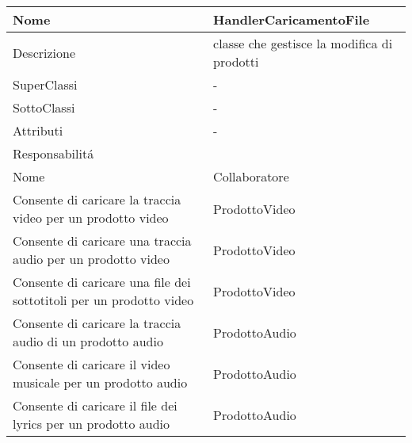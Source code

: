 \begin{center} 
    \begin{longtable}{ |p{3cm}|p{3cm}|p{3cm}|p{3cm}| }
        \hline
        Nome & \multicolumn{3}{|p{9cm}|}{HandlerCaricamentoFile} \\\hline
        Descrizione & \multicolumn{3}{|p{9cm}|}{classe che gestisce la modifica di prodotti} \\\hline
        SuperClassi & \multicolumn{3}{|p{9cm}|}{-} \\\hline
        SottoClassi & \multicolumn{3}{|p{9cm}|}{-} \\\hline
        Attributi & \multicolumn{3}{|p{9cm}|}{-} \\\hline
        \multicolumn{4}{|p{12cm}|}{Responsabilit\'a} \\\hline %
        \multicolumn{2}{|p{6cm}|}{Nome} & \multicolumn{2}{|p{6cm}|}{Collaboratore} \\\hline
        \multicolumn{2}{|p{6cm}|}{Consente di caricare la traccia video per un prodotto video} & \multicolumn{2}{|p{6cm}|}{ProdottoVideo} \\\hline
        \multicolumn{2}{|p{6cm}|}{Consente di caricare una traccia audio per un prodotto video} & \multicolumn{2}{|p{6cm}|}{ProdottoVideo} \\\hline
        \multicolumn{2}{|p{6cm}|}{Consente di caricare una file dei sottotitoli per un prodotto video} & \multicolumn{2}{|p{6cm}|}{ProdottoVideo} \\\hline
        \multicolumn{2}{|p{6cm}|}{Consente di caricare la traccia audio di un prodotto audio} & \multicolumn{2}{|p{6cm}|}{ProdottoAudio} \\\hline
        \multicolumn{2}{|p{6cm}|}{Consente di caricare il video musicale per un prodotto audio} & \multicolumn{2}{|p{6cm}|}{ProdottoAudio} \\\hline
        \multicolumn{2}{|p{6cm}|}{Consente di caricare il file dei lyrics per un prodotto audio} & \multicolumn{2}{|p{6cm}|}{ProdottoAudio} \\\hline
    \end{longtable}
\end{center}

